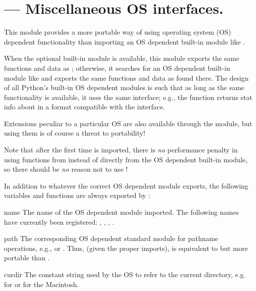 \section{ ---
         Miscellaneous OS interfaces.}



This module provides a more portable way of using operating system
(OS) dependent functionality than importing an OS dependent built-in
module like .

When the optional built-in module  is available, this
module exports the same functions and data as ; otherwise,
it searches for an OS dependent built-in module like  and
exports the same functions and data as found there.  The design of all
Python's built-in OS dependent modules is such that as long as the same
functionality is available, it uses the same interface; e.g., the
function  returns stat info about 
in a format compatible with the \POSIX{} interface.

Extensions peculiar to a particular OS are also available through the
 module, but using them is of course a threat to
portability!

Note that after the first time  is imported, there is
\emph{no} performance penalty in using functions from 
instead of directly from the OS dependent built-in module, so there
should be \emph{no} reason not to use !

In addition to whatever the correct OS dependent module exports, the
following variables and functions are always exported by :

\begin{datadesc}{name}
The name of the OS dependent module imported.  The following names
have currently been registered: , ,
, .
\end{datadesc}

\begin{datadesc}{path}
The corresponding OS dependent standard module for pathname
operations, e.g.,  or .  Thus, (given
the proper imports),  is equivalent to but
more portable than .
\end{datadesc}

\begin{datadesc}{curdir}
The constant string used by the OS to refer to the current directory,
e.g.\  for \POSIX{} or  for the Macintosh.
\end{datadesc}

